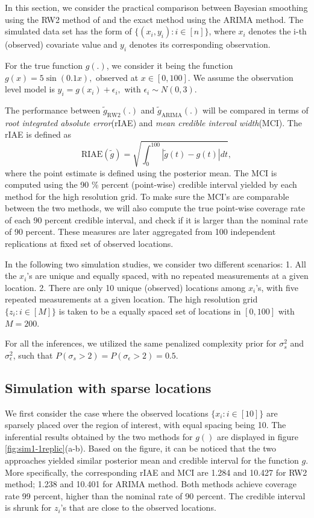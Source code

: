 \documentclass{article}
\begin{document}
In this section, we consider the practical comparison between Bayesian smoothing using the RW2 method of \cite{rw2} and the exact method using the ARIMA method. 
The simulated data set has the form of $\{(x_i,y_i):i\in[n]\}$, where $x_i$ denotes the i-th (observed) covariate value and $y_i$ denotes its corresponding observation. 

For the true function $g(.)$, we consider it being the function $g(x) = 5\sin(0.1x),$ observed at $x \in [0,100]$. We assume the observation level model is $y_i = g(x_i) + \epsilon_i, $ with $\epsilon_i \sim N(0,3)$.

The performance between $\tilde{g}_{\text{RW2}}(.)$ and $\tilde{g}_{\text{ARIMA}}(.)$ will be compared in terms of \textit{root integrated absolute error}(rIAE) and \textit{mean credible interval width}(MCI). The rIAE is defined as $$\text{RIAE}(\tilde{g}) = \sqrt{ \int_0^{100}|\tilde{g}(t)-g(t)|dt},$$ where the point estimate is defined using the posterior mean. The MCI is computed using the 90 \% percent (point-wise) credible interval yielded by each method for the high resolution grid. To make sure the MCI's are comparable between the two methods, we will also compute the true point-wise coverage rate of each 90 percent credible interval, and check if it is larger than the nominal rate of 90 percent. These measures are later aggregated from 100 independent replications at fixed set of observed locations.

In the following two simulation studies, we consider two different scenarios: 1. All the $x_i$'s are unique and equally spaced, with no repeated measurements at a given location. 2. There are only 10 unique (observed) locations among $x_i$'s, with five repeated measurements at a given location. The high resolution grid $\{z_i: i\in [M] \}$ is taken to be a equally spaced set of locations in $[0,100]$ with $M = 200$.

For all the inferences, we utilized the same penalized complexity prior \citep{simpson2017penalising} for $\sigma_s^2$ and $\sigma_\epsilon^2$, such that $P(\sigma_s > 2) = P(\sigma_\epsilon > 2) = 0.5$.


\subsection{Simulation with sparse locations}

We first consider the case where the observed locations $\{x_i: i \in [10] \}$ are sparsely placed over the region of interest, with equal spacing being 10. The inferential results obtained by the two methods for $g()$ are displayed in figure \ref{fig:sim1-1replic}(a-b). Based on the figure, it can be noticed that the two approaches yielded similar posterior mean and credible interval for the function $g$. More specifically, the corresponding rIAE and MCI are 1.284 and 10.427 for RW2 method; 1.238 and 10.401 for ARIMA method. Both methods achieve coverage rate 99 percent, higher than the nominal rate of 90 percent. The credible interval is shrunk for $z_i$'s that are close to the observed locations.
\end{document}
